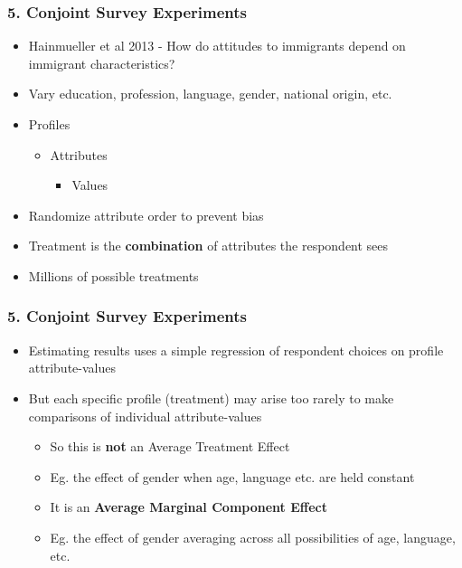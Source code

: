 \documentclass[xcolor=x11names,compress]{beamer}\usepackage[]{graphicx}\usepackage[]{color}
\renewcommand{\(}{\begin{columns}}
\renewcommand{\)}{\end{columns}}
\newcommand{\<}[1]{\begin{column}{#1}}
\renewcommand{\>}{\end{column}}
\begin{document}
\begin{frame}
\frametitle{5. Conjoint Survey Experiments}
\begin{itemize}
\item Hainmueller et al 2013 - How do attitudes to immigrants depend on immigrant characteristics?
\pause
\item Vary education, profession, language, gender, national origin, etc.
\pause
\item Profiles
\begin{itemize}
\item Attributes
\begin{itemize}
\item Values
\end{itemize}
\end{itemize}
\pause
\item Randomize attribute order to prevent bias
\pause
\item Treatment is the \textbf{combination} of attributes the respondent sees
\pause
\item Millions of possible treatments
\end{itemize}
\end{frame}





\begin{frame}
\frametitle{5. Conjoint Survey Experiments}
\begin{itemize}
\item Estimating results uses a simple regression of respondent choices on profile attribute-values
\pause
\item But each specific profile (treatment) may arise too rarely to make comparisons of individual attribute-values
\pause
\begin{itemize}
\item So this is \textbf{not} an Average Treatment Effect
\pause
\item Eg. the effect of gender when age, language etc. are held constant
\pause
\item It is an \textbf{Average Marginal Component Effect}
\pause
\item Eg. the effect of gender averaging across all possibilities of age, language, etc.
\end{itemize}
\end{itemize}
\end{frame}
\end{document}
